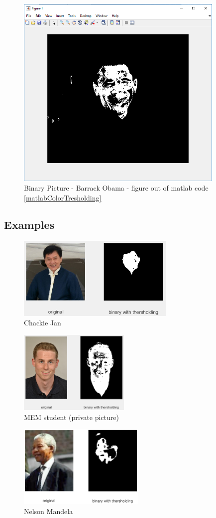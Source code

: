 \documentclass[Bachelorarbeit.tex]{subfiles}
\begin{document}
\begin{figure}[!h]
\centering
\includegraphics[width=10cm]{./img/thresholds/obama_matlab.PNG}
\caption[Binary Picture - Barrack Obama]{Binary Picture - Barrack Obama - figure out of matlab code \ref{matlabColorTresholding}}
\label{obamaThres}
\end{figure}

\subsection{Examples}

\begin{figure}[!h]
\centering
\includegraphics[height = 4cm]{./img/thresholds/chackie}
\caption{Chackie Jan}
\end{figure}

\begin{figure}[!h]
\centering
\includegraphics[height = 4cm]{./img/thresholds/tobiBu}
\caption{MEM student (private picture)}
\end{figure}
\begin{figure}[!h]
\centering
\includegraphics[height = 4cm]{./img/thresholds/mandela}
\caption{Nelson Mandela}
\end{figure}



	
\end{document}
